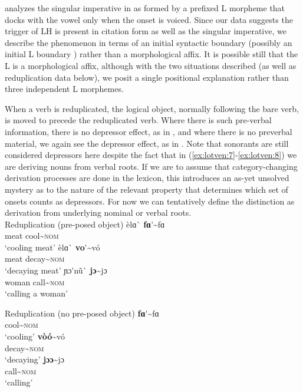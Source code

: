 \documentclass[output=paper
,newtxmath
,modfonts
,nonflat]{langsci/langscibook}
\begin{document}
\citet{Bradshaw1999} analyzes the singular imperative in  as formed by a prefixed L  morpheme that docks with the vowel only when the onset is voiced. Since our data suggests the trigger of LH is present in citation form as well as the singular imperative, we describe the phenomenon in terms of an initial syntactic boundary (possibly an initial L boundary ) rather than a morphological affix. It is possible still that the L  is a morphological affix, although with the two situations described (as well as reduplication data below), we posit a single positional explanation rather than three independent L  morphemes. 

When a verb is reduplicated, the logical object, normally following the bare verb, is moved to precede the reduplicated verb. Where there is such pre-verbal information, there is no depressor effect, as in , and where there is no preverbal material, we again see the depressor effect, as in . Note that sonorants are still considered depressors here despite the fact that in (\ref{ex:lotven:7}-\ref{ex:lotven:8}) we are deriving nouns from verbal roots. If we are to assume that category-changing derivation processes are done in the lexicon, this introduces an as-yet unsolved mystery as to the nature of the relevant property that determines which set of onsets counts as depressors. For now we can tentatively define the distinction as derivation from underlying nominal or verbal roots. 
\\
\ea\label{ex:lotven:7}Reduplication (pre-posed object)
\ea\label{ex:lotven:7a}
    \gll èlɑ\`{} \textbf{fɑ}\'{}{\textasciitilde}fɑ\\
    meat  cool{\textasciitilde}\textsc{nom} \\
    \glt ‘cooling meat’
\ex\label{ex:lotven:7b}
	\gll èlɑ\`{}     \textbf{vo}\'{}{\textasciitilde}vó\\
    meat decay{\textasciitilde}\textsc{nom}\\
    \glt ‘decaying meat’
\ex\label{ex:lotven:7c}
	\gll ɲɔ\'{}nũ\`{}  \textbf{jɔ}{\textasciitilde}jɔ\\
	woman call{\textasciitilde}\textsc{nom}\\
    \glt ‘calling a woman’
\z
\z

\ea\label{ex:lotven:8}Reduplication (no pre-posed object)
\ea\label{ex:lotven:8a}    
    \gll \textbf{fɑ}\'{}{\textasciitilde}fɑ\\
    cool{\textasciitilde}\textsc{nom}    \\
    \glt ‘cooling’
\ex\label{ex:lotven:8b}
	\gll \textbf{vòó}{\textasciitilde}vó\\
    decay{\textasciitilde}\textsc{nom}\\
    \glt ‘decaying’
\ex\label{ex:lotven:8c}
	\gll \textbf{jɔɔ}{\textasciitilde}jɔ\\
    call{\textasciitilde}\textsc{nom} \\
    \glt ‘calling’
\z
\z
\end{document}
